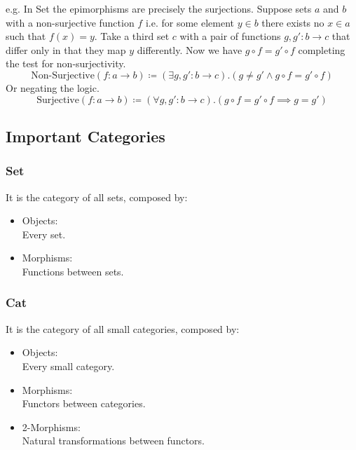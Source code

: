 e.g. In Set the epimorphisms are precisely the surjections.
Suppose sets $a$ and $b$ with a non-surjective function $f$ i.e. for some
element $y\in b$ there exists no $x\in a$ such that $f(x) = y$. Take a third
set $c$ with a pair of functions $g, g':b\to c$ that differ only in that
they map $y$ differently. Now we have $g\circ f = g'\circ f$ completing the
test for non-surjectivity.
\[\text{Non-Surjective}(f:a\to b) \coloneq(\exists g, g':b\to c).(g \neq g'
  \land g\circ f = g'\circ f)\] Or negating the logic.
\[\text{Surjective}(f:a\to b) \coloneq(\forall g, g':b\to c).(g\circ f =
  g'\circ f \implies g=g')\]

\subsection{Important Categories}

\subsubsection*{Set}
It is the category of all sets, composed by: \parencite{awodey:category_theory}
\begin{itemize}
  \item Objects:\\
        Every set.
  \item Morphisms:\\
        Functions between sets.
\end{itemize}

\subsubsection*{Cat}
It is the category of all small categories, composed by:
\parencite{adamek_herrlich_strecker:joy_cats}
\begin{itemize}
  \item Objects:\\
        Every small category.
  \item Morphisms:\\
        Functors between categories.
  \item 2-Morphisms:\\
        Natural transformations between functors.
\end{itemize}